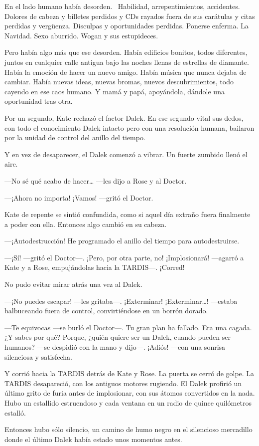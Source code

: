 En el lado humano había desorden. ~Habilidad, arrepentimientos,
accidentes. Dolores de cabeza y billetes perdidos y CDs rayados fuera de
sus carátulas y citas perdidas y vergüenza. Disculpas y oportunidades
perdidas. Ponerse enferma. La Navidad. Sexo aburrido. Wogan y sus
estupideces.

Pero había algo más que ese desorden. Había edificios bonitos, todos
diferentes, juntos en cualquier calle antigua bajo las noches llenas de
estrellas de diamante. Había la emoción de hacer un nuevo amigo. Había
música que nunca dejaba de cambiar. Había nuevas ideas, nuevas bromas,
nuevos descubrimientos, todo cayendo en ese caos humano. Y mamá y papá,
apoyándola, dándole una oportunidad tras otra.

Por un segundo, Kate rechazó el factor Dalek. En ese segundo vital sus
dedos, con todo el conocimiento Dalek intacto pero con una resolución
humana, bailaron por la unidad de control del anillo del tiempo.

Y en vez de desaparecer, el Dalek comenzó a vibrar. Un fuerte zumbido
llenó el aire.

---No sé qué acabo de hacer\ldots{} ---les dijo a Rose y al Doctor.

---¡Ahora no importa! ¡Vamos! ---gritó el Doctor.

Kate de repente se sintió confundida, como si aquel día extraño fuera
finalmente a poder con ella. Entonces algo cambió en su cabeza.

---¡Autodestrucción! He programado el anillo del tiempo para
autodestruirse.

---¡Sí! ---gritó el Doctor---. ¡Pero, por otra parte, no! ¡Implosionará!
---agarró a Kate y a Rose, empujándolas hacia la TARDIS---. ¡Corred!

No pudo evitar mirar atrás una vez al Dalek.

---¡No puedes escapar! ---les gritaba---. ¡Exterminar!
¡Exterminar\ldots{}! ---estaba balbuceando fuera de control,
convirtiéndose en un borrón dorado.

---Te equivocas ---se burló el Doctor---. Tu gran plan ha fallado. Era una
cagada. ¿Y sabes por qué? Porque, ¿quién quiere ser un Dalek, cuando
pueden ser humanos? ---se despidió con la mano y dijo---. ¡Adiós! ---con
una sonrisa silenciosa y satisfecha.

Y corrió hacia la TARDIS detrás de Kate y Rose. La puerta se cerró de
golpe. La TARDIS desapareció, con los antiguos motores rugiendo. El
Dalek profirió un último grito de furia antes de implosionar, con sus
átomos convertidos en la nada. Hubo un estallido estruendoso y cada
ventana en un radio de quince quilómetros estalló.

Entonces hubo sólo silencio, un camino de humo negro en el silencioso
mercadillo donde el último Dalek había estado unos momentos antes.